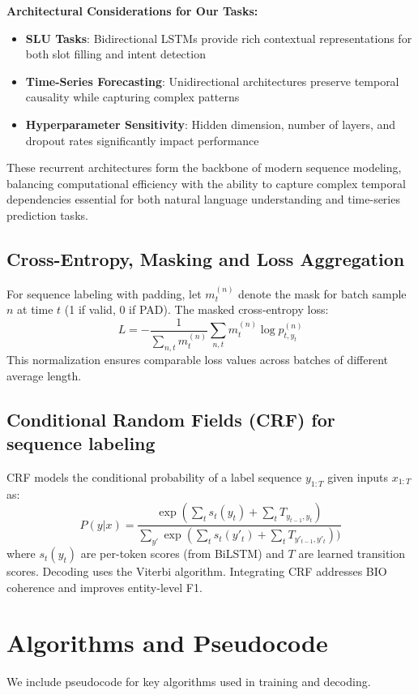 \documentclass[conference]{IEEEtran}
\begin{document}
\textbf{Architectural Considerations for Our Tasks:}
\begin{itemize}
  \item \textbf{SLU Tasks}: Bidirectional LSTMs provide rich contextual representations for both slot filling and intent detection
  \item \textbf{Time-Series Forecasting}: Unidirectional architectures preserve temporal causality while capturing complex patterns
  \item \textbf{Hyperparameter Sensitivity}: Hidden dimension, number of layers, and dropout rates significantly impact performance
\end{itemize}

These recurrent architectures form the backbone of modern sequence modeling, balancing computational efficiency with the ability to capture complex temporal dependencies essential for both natural language understanding and time-series prediction tasks.

\subsection{Cross-Entropy, Masking and Loss Aggregation}
For sequence labeling with padding, let $m_{t}^{(n)}$ denote the mask for batch sample $n$ at time $t$ (1 if valid, 0 if PAD). The masked cross-entropy loss:
\begin{equation}
  L = -\frac{1}{\sum_{n,t} m_{t}^{(n)}}\sum_{n,t} m_{t}^{(n)} \log p_{t,y_t}^{(n)}
\end{equation}
This normalization ensures comparable loss values across batches of different average length.

\subsection{Conditional Random Fields (CRF) for sequence labeling}
CRF models the conditional probability of a label sequence $y_{1:T}$ given inputs $x_{1:T}$ as:
\begin{equation}
  P(y|x) = \frac{\exp\left(\sum_{t} s_{t}(y_t) + \sum_{t} T_{y_{t-1},y_t}\right)}{\sum_{y'} \exp(\sum_{t}s_{t}(y'_t) + \sum_{t} T_{y'_{t-1},y'_t}))}
\end{equation}
where $s_t(y_t)$ are per-token scores (from BiLSTM) and $T$ are learned transition scores. Decoding uses the Viterbi algorithm. Integrating CRF addresses BIO coherence and improves entity-level F1.

\section{Algorithms and Pseudocode}
We include pseudocode for key algorithms used in training and decoding.
\end{document}
